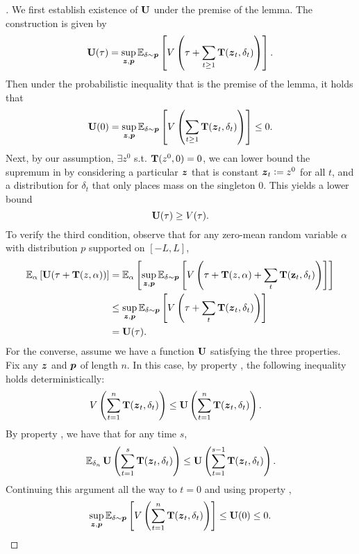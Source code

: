 \begin{proof}[]
We first establish existence of $\mathbf{U}$ under the premise of the lemma. The construction is given by
\begin{equation}
\label{eq:u_construction}
\mathbf{U}(\tau) = \sup_{\boldsymbol{z},  \boldsymbol{p}} \operatorname{\mathbb{E}}_{\delta \sim \boldsymbol{p}}\left[ V\left(\tau + \sum_{t\geq 1} \mathbf{T}(\boldsymbol{z}_t,\delta_t) \right)\right].
\end{equation}
Then under the probabilistic inequality that is the premise of the lemma, it holds that
\[
\mathbf{U}(0) = \sup_{\boldsymbol{z},  \boldsymbol{p}} \operatorname{\mathbb{E}}_{\delta \sim \boldsymbol{p}}\left[ V\left(\sum_{t\geq 1} \mathbf{T}(\boldsymbol{z}_t,\delta_t) \right)\right] \le 0.
\]
 Next, by our assumption, $\exists z^0 $ s.t. $\mathbf{T}(z^0,0) = 0$, we can lower bound the supremum in  by considering a particular $\boldsymbol{z}$ that is constant $\boldsymbol{z}_t\vcentcolon= z^0$ for all $t$, and a distribution for $\delta_t$ that only places mass on the singleton $0$. This yields a lower bound
$$
\mathbf{U}(\tau) \ge V(\tau).
$$
To verify the third condition, observe that for any zero-mean random variable $\alpha$ with distribution $p$ supported on $[-L,L]$,
\begin{align*}
\operatorname{\mathbb{E}}_{\alpha}\left[\mathbf{U}(\tau + \mathbf{T}(z,\alpha))\right] &=  \operatorname{\mathbb{E}}_{\alpha}\left[ \sup_{\boldsymbol{z}, \boldsymbol{p}} \operatorname{\mathbb{E}}_{\delta \sim \boldsymbol{p}}\left[ V\left(\tau + \mathbf{T}(z,\alpha) + \sum_t \mathbf{T}(\mathbf{z}_t, \delta_t) \right)\right] \right]\\
 &\le   \sup_{\boldsymbol{z}, \boldsymbol{p}} \operatorname{\mathbb{E}}_{\delta \sim \boldsymbol{p}}\left[ V\left(\tau  + \sum_t \mathbf{T}(\boldsymbol{z}_t, \delta_t) \right)\right] \\
 & = \mathbf{U}(\tau).
\end{align*}
For the converse, assume we have a function $\mathbf{U}$ satisfying the three properties. Fix any $\boldsymbol{z}$ and $\boldsymbol{p}$ of length $n$. In this case, by property \proptwo, the following inequality holds deterministically:
\begin{align*}
 V\left(\sum_{t=1}^n \mathbf{T}(\boldsymbol{z}_t,\delta_t)\right)  & \le \mathbf{U}\left(\sum_{t=1}^n \mathbf{T}(\boldsymbol{z}_t,\delta_t)\right).
\end{align*}
By property \propthree, we have that for any time $s$,
\begin{align*}
\operatorname{\mathbb{E}}_{\delta_n} \mathbf{U}\left(\sum_{t=1}^s \mathbf{T}(\boldsymbol{z}_t,\delta_t)\right) \le   \mathbf{U}\left(\sum_{t=1}^{s-1} \mathbf{T}(\boldsymbol{z}_t,\delta_t)\right).
\end{align*}
Continuing this argument all the way to $t=0$ and using property \propone,
\begin{align*}
\sup_{\boldsymbol{z}, \boldsymbol{p}} \operatorname{\mathbb{E}}_{\delta \sim \boldsymbol{p}}\left[  V\left(\sum_{t=1}^n \mathbf{T}(\boldsymbol{z}_t,\delta_t)\right) \right] \le \mathbf{U}(0) \le 0.
\end{align*}
\end{proof}




